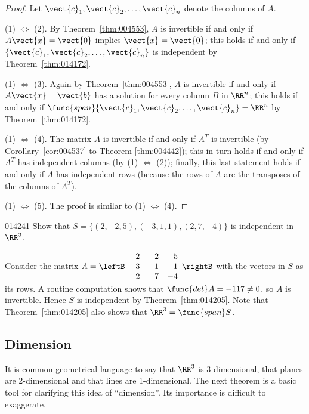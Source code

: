 \begin{proof}
Let $\vect{c}_{1}, \vect{c}_{2}, \dots, \vect{c}_{n}$ denote the columns of $A$.

(1) $\Leftrightarrow$ (2). By Theorem~\ref{thm:004553}, $A$ is invertible if and only if $A\vect{x} = \vect{0}$ implies $\vect{x} = \vect{0}$; this holds if and only if $\{\vect{c}_{1}, \vect{c}_{2}, \dots, \vect{c}_{n}\}$ is independent by Theorem~\ref{thm:014172}.

(1) $\Leftrightarrow$ (3). Again by Theorem~\ref{thm:004553}, $A$ is invertible if and only if $A\vect{x} = \vect{b}$ has a solution for every column $B$ in $\RR^n$; this holds if and only if $\func{span}\{\vect{c}_{1}, \vect{c}_{2}, \dots, \vect{c}_{n}\} = \RR^n$ by Theorem~\ref{thm:014172}.

(1) $\Leftrightarrow$ (4). The matrix $A$ is invertible if and only if $A^{T}$ is invertible (by Corollary~\ref{cor:004537} to Theorem \ref{thm:004442}); this in turn holds if and only if $A^{T}$ has independent columns (by (1) $\Leftrightarrow$ (2)); finally, this last statement holds if and only if $A$ has independent rows (because the rows of $A$ are the transposes of the columns of $A^{T}$).

(1) $\Leftrightarrow$ (5). The proof is similar to (1) $\Leftrightarrow$ (4).
\end{proof}

\begin{example}{}{014241}
Show that $S = \{(2, -2, 5), (-3, 1, 1), (2, 7, -4)\}$ is independent in $\RR^3$.

\begin{solution}
Consider the matrix
$A = 
\leftB \begin{array}{rrr}
2 & -2 & 5 \\
-3 & 1 & 1 \\
2 & 7 & -4
\end{array} \rightB $ with the vectors in $S$ as its rows. A routine computation shows that $\func{det} A = -117 \neq 0$, so $A$ is invertible. Hence $S$ is independent by Theorem~\ref{thm:014205}. Note that Theorem~\ref{thm:014205} also shows that $\RR^3 = \func{span} S$.
\end{solution}
\end{example}

\subsection*{Dimension}

It is common geometrical language to say that $\RR^3$ is 3-dimensional, that planes are 2-dimensional and that lines are 1-dimensional. The next theorem is a basic tool for clarifying this idea of ``dimension''. Its importance is difficult to exaggerate.

